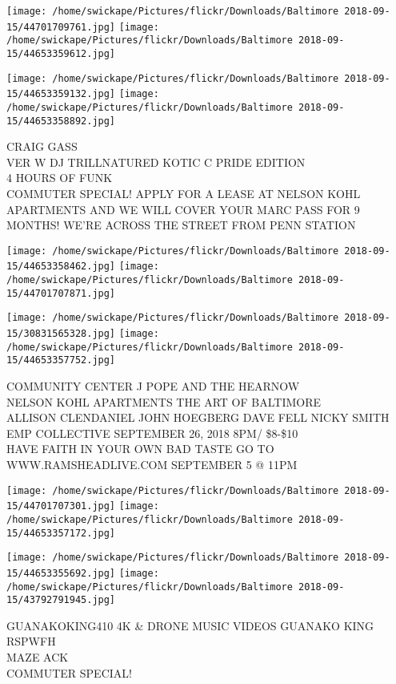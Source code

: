\documentclass[10pt,letterpaper]{article}
\begin{document}
\texttt{[image: /home/swickape/Pictures/flickr/Downloads/Baltimore 2018-09-15/44701709761.jpg]}
\texttt{[image: /home/swickape/Pictures/flickr/Downloads/Baltimore 2018-09-15/44653359612.jpg]}

\texttt{[image: /home/swickape/Pictures/flickr/Downloads/Baltimore 2018-09-15/44653359132.jpg]}
\texttt{[image: /home/swickape/Pictures/flickr/Downloads/Baltimore 2018-09-15/44653358892.jpg]}

CRAIG GASS\\
VER W DJ TRILLNATURED KOTIC C PRIDE EDITION\\
4 HOURS OF FUNK\\
COMMUTER SPECIAL!  APPLY FOR A LEASE AT NELSON KOHL APARTMENTS AND WE WILL COVER YOUR MARC PASS FOR 9 MONTHS!  WE'RE ACROSS THE STREET FROM PENN STATION
\pagebreak

\texttt{[image: /home/swickape/Pictures/flickr/Downloads/Baltimore 2018-09-15/44653358462.jpg]}
\texttt{[image: /home/swickape/Pictures/flickr/Downloads/Baltimore 2018-09-15/44701707871.jpg]}

\texttt{[image: /home/swickape/Pictures/flickr/Downloads/Baltimore 2018-09-15/30831565328.jpg]}
\texttt{[image: /home/swickape/Pictures/flickr/Downloads/Baltimore 2018-09-15/44653357752.jpg]}

COMMUNITY CENTER J POPE AND THE HEARNOW\\
NELSON KOHL APARTMENTS THE ART OF BALTIMORE\\
ALLISON CLENDANIEL JOHN HOEGBERG DAVE FELL NICKY SMITH EMP COLLECTIVE SEPTEMBER 26, 2018 8PM/ \$8{-}\$10\\
HAVE FAITH IN YOUR OWN BAD TASTE GO TO WWW.RAMSHEADLIVE.COM SEPTEMBER 5 @ 11PM
\pagebreak

\texttt{[image: /home/swickape/Pictures/flickr/Downloads/Baltimore 2018-09-15/44701707301.jpg]}
\texttt{[image: /home/swickape/Pictures/flickr/Downloads/Baltimore 2018-09-15/44653357172.jpg]}

\texttt{[image: /home/swickape/Pictures/flickr/Downloads/Baltimore 2018-09-15/44653355692.jpg]}
\texttt{[image: /home/swickape/Pictures/flickr/Downloads/Baltimore 2018-09-15/43792791945.jpg]}

GUANAKOKING410 4K \& DRONE MUSIC VIDEOS GUANAKO KING\\
RSPWFH\\
MAZE ACK\\
COMMUTER SPECIAL!
\pagebreak
\end{document}
